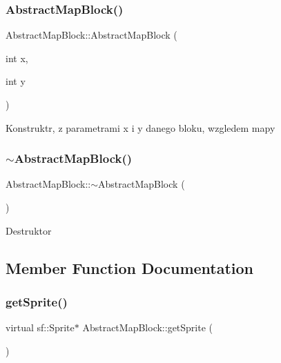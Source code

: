 \subsubsection{\texorpdfstring{Abstract\+Map\+Block()}{AbstractMapBlock()}\hspace{0.1cm}{\footnotesize\ttfamily [2/2]}}
{\footnotesize\ttfamily Abstract\+Map\+Block\+::\+Abstract\+Map\+Block (\begin{DoxyParamCaption}\item[{int}]{x,  }\item[{int}]{y }\end{DoxyParamCaption})}

Konstruktr, z parametrami x i y danego bloku, wzgledem mapy \mbox{\label{class_abstract_map_block_a1915732c2d02eb6385b6e2c007666efa}} 
\subsubsection{\texorpdfstring{$\sim$\+Abstract\+Map\+Block()}{~AbstractMapBlock()}}
{\footnotesize\ttfamily Abstract\+Map\+Block\+::$\sim$\+Abstract\+Map\+Block (\begin{DoxyParamCaption}{ }\end{DoxyParamCaption})\hspace{0.3cm}{\ttfamily [virtual]}}

Destruktor 

\subsection{Member Function Documentation}
\mbox{\label{class_abstract_map_block_ab5a448a1b6478d10a8814c6d19c4fdb4}} 
\subsubsection{\texorpdfstring{get\+Sprite()}{getSprite()}}
{\footnotesize\ttfamily virtual sf\+::\+Sprite$\ast$ Abstract\+Map\+Block\+::get\+Sprite (\begin{DoxyParamCaption}{ }\end{DoxyParamCaption})\hspace{0.3cm}{\ttfamily [pure virtual]}}

